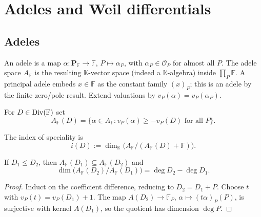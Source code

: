 \chapter{Adeles and Weil differentials}
\label{par-chap-adeles}

\section{Adeles}
\begin{definition}[Adele]
\label{par-def-adele}
\uses{}
An adele is a map $\alpha:\mathbf P_{\mathbb F}\to\mathbb F$, $P\mapsto\alpha_P$,
with $\alpha_P\in\mathcal O_P$ for almost all $P$. The adele space
$A_{\mathbb F}$ is the resulting $\mathbb K$-vector space (indeed a
$\mathbb K$-algebra) inside $\prod_P\mathbb F$. A principal adele embeds
$x\in\mathbb F$ as the constant family $(x)_P$; this is an adele by the finite
zero/pole result. Extend valuations by $v_P(\alpha)=v_P(\alpha_P)$.
\end{definition}

\begin{definition}
\label{par-def-adele-D}
\uses{}
For $D\in\operatorname{Div}(\mathbb F)$ set
\[
A_{\mathbb F}(D)=\{\alpha\in A_{\mathbb F}:v_P(\alpha)\geq-v_P(D)\text{ for all }P\}.
\]
\end{definition}

\begin{definition}
\label{par-def-index-speciality}
\uses{}
The index of speciality is
\[
i(D):=\dim_{\mathbb K}\bigl(A_{\mathbb F}/(A_{\mathbb F}(D)+\mathbb F)\bigr).
\]
\end{definition}

\begin{lemma}
\label{par-lem-adele-quotient}
\uses{}
If $D_1\leq D_2$, then $A_{\mathbb F}(D_1)\subseteq A_{\mathbb F}(D_2)$ and
\[
\dim\bigl(A_{\mathbb F}(D_2)/A_{\mathbb F}(D_1)\bigr)=\deg D_2-\deg D_1.
\]
\end{lemma}
\begin{proof}
Induct on the coefficient difference, reducing to $D_2=D_1+P$. Choose $t$ with
$v_P(t)=v_P(D_1)+1$. The map
$A(D_2)\to\mathbb F_P$, $\alpha\mapsto(t\alpha)_P(P)$, is surjective with kernel
$A(D_1)$, so the quotient has dimension $\deg P$.
\end{proof}

